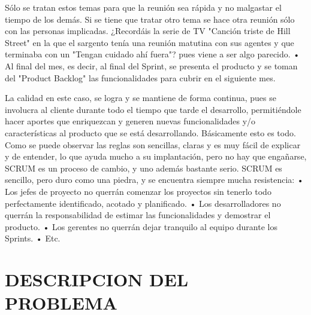         Sólo se tratan estos temas para que la reunión sea rápida y no malgastar el
        tiempo de los demás. Si se tiene que tratar otro tema se hace otra reunión sólo
        con las personas implicadas. ¿Recordáis la serie de TV "Canción triste de Hill
        Street" en la que el sargento tenía una reunión matutina con sus agentes y que
        terminaba con un "Tengan cuidado ahí fuera"? pues viene a ser algo parecido.
    •   Al final del mes, es decir, al final del Sprint, se presenta el producto y se toman
        del "Product Backlog" las funcionalidades para cubrir en el siguiente mes.

La calidad en este caso, se logra y se mantiene de forma continua, pues se involucra
al cliente durante todo el tiempo que tarde el desarrollo, permitiéndole hacer aportes
que enriquezcan y generen nuevas funcionalidades y/o características al producto que
se está desarrollando.
Básicamente esto es todo.
Como se puede observar las reglas son sencillas, claras y es muy fácil de explicar y de
entender, lo que ayuda mucho a su implantación, pero no hay que engañarse, SCRUM
es un proceso de cambio, y uno además bastante serio.
SCRUM es sencillo, pero duro como una piedra, y se encuentra siempre mucha
resistencia:
    •   Los jefes de proyecto no querrán comenzar los proyectos sin tenerlo todo
        perfectamente identificado, acotado y planificado.
    •   Los desarrolladores no querrán la               responsabilidad    de  estimar   las
        funcionalidades y demostrar el producto.
    •   Los gerentes no querrán dejar tranquilo al equipo durante los Sprints.
    •   Etc.

\section{DESCRIPCION DEL PROBLEMA}

%
